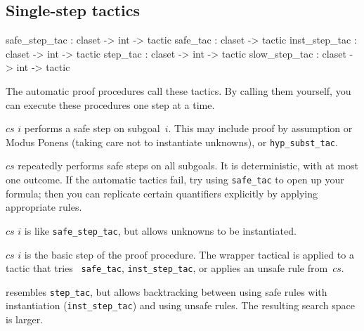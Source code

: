 \subsection{Single-step tactics}
\begin{ttbox} 
safe_step_tac : claset -> int -> tactic
safe_tac      : claset        -> tactic
inst_step_tac : claset -> int -> tactic
step_tac      : claset -> int -> tactic
slow_step_tac : claset -> int -> tactic
\end{ttbox}
The automatic proof procedures call these tactics.  By calling them
yourself, you can execute these procedures one step at a time.
\begin{ttdescription}
\item[\ttindexbold{safe_step_tac} $cs$ $i$] performs a safe step on
subgoal~$i$.  This may include proof by assumption or Modus Ponens (taking
care not to instantiate unknowns), or {\tt hyp_subst_tac}.

\item[\ttindexbold{safe_tac} $cs$] repeatedly performs safe steps on all 
subgoals.  It is deterministic, with at most one outcome.  If the automatic
tactics fail, try using {\tt safe_tac} to open up your formula; then you
can replicate certain quantifiers explicitly by applying appropriate rules.

\item[\ttindexbold{inst_step_tac} $cs$ $i$] is like {\tt safe_step_tac},
but allows unknowns to be instantiated.

\item[\ttindexbold{step_tac} $cs$ $i$] is the basic step of the proof
  procedure.  The wrapper tactical is applied to a tactic that tries {\tt
    safe_tac}, {\tt inst_step_tac}, or applies an unsafe rule from~$cs$.

\item[\ttindexbold{slow_step_tac}] 
  resembles {\tt step_tac}, but allows backtracking between using safe
  rules with instantiation ({\tt inst_step_tac}) and using unsafe rules.
  The resulting search space is larger.
\end{ttdescription}

